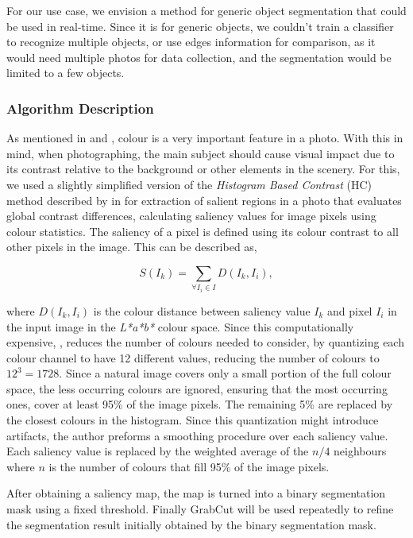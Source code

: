 For our use case, we envision a method for generic object segmentation that could be used in real-time. Since it is for generic objects, we couldn't train a classifier to recognize multiple objects, or use edges information for comparison, as it would need multiple photos for data collection, and the segmentation would be limited to a few objects. 

\subsubsection{Algorithm Description}
\label{subsub:seg_algorithm}

As mentioned in \cite{Santos} and \cite{kamps2012rules}, colour is a very important feature in a photo. With this in mind, when photographing, the main subject should cause visual impact due to its contrast relative to the background or other elements in the scenery. For this, we used a slightly simplified version of the \emph{Histogram Based Contrast} (HC) method described by \citeauthor{cheng2011global} in \cite{cheng2011global} for extraction of salient regions in a photo that evaluates global contrast differences, calculating saliency values for image pixels using colour statistics. The saliency of a pixel is defined using its colour contrast to all other pixels in the image. This can be described as,

\begin{equation}
S(I_{k}) = \sum_{\forall I_{i} \in I} D(I_{k}, I_{i}),
\end{equation}

where $D(I_{k}, I_{i})$ is the colour distance between saliency value $I_{k}$ and pixel $I_{i}$ in the input image in the \emph{L*a*b*} colour space. Since this computationally expensive, \citeauthor{cheng2011global}, reduces the number of colours needed to consider, by quantizing each colour channel to have 12 different values, reducing the number of colours to $12^{3} = 1728$. Since a natural image covers only a small portion of the full colour space, the less occurring colours are ignored, ensuring that the most occurring ones, cover at least 95\% of the image pixels. The remaining 5\% are replaced by the closest colours in the histogram. Since this quantization might introduce artifacts, the author preforms a smoothing procedure over each saliency value. Each saliency value is replaced by the weighted average of the $n/4$ neighbours where $n$ is the number of colours that fill 95\% of the image pixels.

After obtaining a saliency map, the map is turned into a binary segmentation mask using a fixed threshold. Finally GrabCut\cite{rother2004grabcut} will be used repeatedly to refine the segmentation result initially obtained by the binary segmentation mask.

